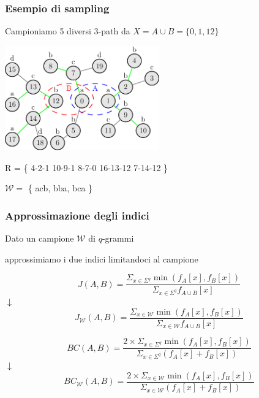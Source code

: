 \begin{frame}
	\frametitle{Esempio di sampling}
	\centering
	
	Campioniamo 5 diversi $3$-path da $X = A \cup B = \{ 0, 1, 12 \}$
	
	\includegraphics[width=0.5\textwidth]{images/13_sampl}
	
	\medskip
	
	R = \{ \color{green} 4-2-1 \color{darkgreen} 10-9-1  \color{green} 8-7-0 \color{darkgreen} 16-13-12  \color{green} 7-14-12 \color{black}\}
	
	$\mathcal{W} = $ \{ acb, bba, bca \}
	
	
\end{frame}

\begin{frame}
\frametitle{Approssimazione degli indici}
\centering

Dato un campione $\mathcal{W}$ di $q$-grammi 

approssimiamo i due indici limitandoci al campione

\pause

\begin{equation*}\label{jaccard-sub}	
J(A,B) = \frac{ \Sigma_{x \in \Sigma^{q}} \min(f_{A}[x], f_{B}[x]) }{ \Sigma_{x \in \Sigma^{q}} f_{A \cup B}[x] }
\end{equation*}
$\downarrow$
\begin{equation*}\label{jaccard-sub}	
J_{\mathcal{W}}(A,B) = \frac{ \Sigma_{x \in \mathcal{W}} \min(f_{A}[x], f_{B}[x]) }{ \Sigma_{x \in \mathcal{W}} f_{A \cup B}[x] }
\end{equation*}

\pause

\begin{equation*}\label{bray-sub}
BC(A,B) = \frac{ 2 \times \Sigma_{x \in \Sigma^{q}} \min(f_{A}[x], f_{B}[x]) }{ \Sigma_{x \in \Sigma^{q}} (f_{A}[x] + f_{B}[x]) }
\end{equation*}
$\downarrow$
\begin{equation*}\label{bray-sub}
BC_{\mathcal{W}}(A,B) = \frac{ 2 \times \Sigma_{x \in \mathcal{W}} \min(f_{A}[x], f_{B}[x]) }{ \Sigma_{x \in \mathcal{W}} (f_{A}[x] + f_{B}[x]) }
\end{equation*}

\end{frame}

